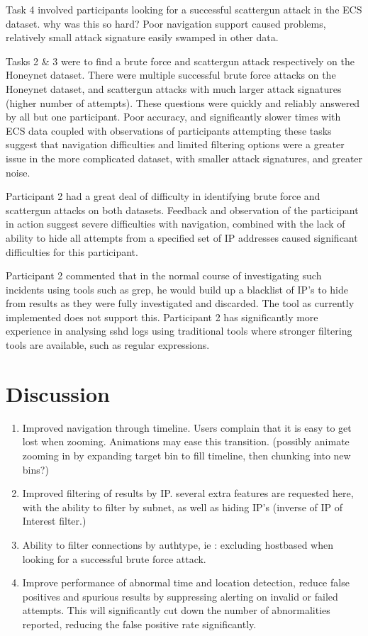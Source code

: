 Task 4 involved participants looking for a successful scattergun attack in the ECS dataset. why was this so hard? Poor navigation support caused problems, relatively small attack signature easily swamped in other data.

Tasks 2 \& 3 were to find a brute force and scattergun attack respectively on the Honeynet dataset.
There were multiple successful brute force attacks on the Honeynet dataset, and scattergun attacks with much larger attack signatures (higher number of attempts). These questions were quickly and reliably answered by all but one participant. Poor accuracy, and significantly slower times with ECS data coupled with observations of participants attempting these tasks suggest that navigation difficulties and limited filtering options were a greater issue in the more complicated dataset, with smaller attack signatures, and greater noise. 

Participant 2 had a great deal of difficulty in identifying brute force and scattergun attacks on both datasets. Feedback and observation of the participant in action suggest severe difficulties with navigation, combined with the lack of ability to hide all attempts from a specified set of IP addresses caused significant difficulties for this participant.

Participant 2 commented that in the normal course of investigating such incidents using tools such as grep, he would build up a blacklist of IP's to hide from results as they were fully investigated and discarded.
The tool as currently implemented does not support this. Participant 2 has significantly more experience in analysing sshd logs using traditional tools where stronger filtering tools are available, such as regular expressions. 

\section{Discussion} 
\begin{enumerate}
\item{Improved navigation through timeline. Users complain that it is easy to get lost when zooming. Animations may ease this transition. (possibly animate zooming in by expanding target bin to fill timeline, then chunking into new bins?)}
\item{Improved filtering of results by IP. several extra features are requested here, with the ability to filter by subnet, as well as hiding IP's (inverse of IP of Interest filter.)}
\item{Ability to filter connections by authtype, ie : excluding hostbased when looking for a successful brute force attack.}
\item{Improve performance of abnormal time and location detection, reduce false positives and spurious results by suppressing alerting on invalid or failed attempts. This will significantly cut down the number of abnormalities reported, reducing the false positive rate significantly.}
\end{enumerate}

